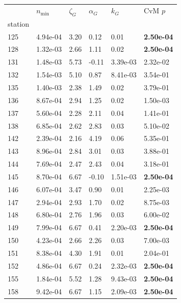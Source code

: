 \begin{figure}[htbp!]
{\begin{minipage}[t]{0.48\linewidth}
        \centering
        \begin{tabular}{llllll}
        \toprule
         & $n_{\min}$ & $\zeta_G$ & $\alpha_G$ & $k_G$ & CvM $p$ \\
        station &  &  &  &  &  \\
        \midrule
                    125 & 4.94e-04 & 3.20 & 0.12 & 0.01 & \textbf{2.50e-04}\\
                    128 & 1.32e-03 & 2.66 & 1.11 & 0.02 & \textbf{2.50e-04}\\
                    131 & 1.48e-03 & 5.73 & -0.11 & 3.39e-03 & 2.32e-02\\
                    132 & 1.54e-03 & 5.10 & 0.87 & 8.41e-03 & 3.54e-01\\
                    135 & 1.40e-03 & 2.38 & 1.49 & 0.02 & 3.79e-01\\
                    136 & 8.67e-04 & 2.94 & 1.25 & 0.02 & 1.50e-03\\
                    137 & 5.60e-04 & 2.28 & 2.11 & 0.04 & 1.41e-01\\
                    138 & 6.85e-04 & 2.62 & 2.83 & 0.03 & 5.10e-02\\
                    142 & 2.39e-04 & 2.16 & 4.19 & 0.06 & 5.35e-01\\
                    143 & 8.96e-04 & 2.84 & 3.01 & 0.03 & 3.88e-01\\
                    144 & 7.69e-04 & 2.47 & 2.43 & 0.04 & 3.18e-01\\
                    145 & 8.70e-04 & 6.67 & -0.10 & 1.51e-03 & \textbf{2.50e-04}\\
                    146 & 6.07e-04 & 3.47 & 0.90 & 0.01 & 2.25e-03\\
                    147 & 2.94e-04 & 2.93 & 1.70 & 0.02 & 8.75e-03\\
                    148 & 6.80e-04 & 2.76 & 1.96 & 0.03 & 6.00e-02\\
                    149 & 7.99e-04 & 6.67 & 0.41 & 2.20e-03 & \textbf{2.50e-04}\\
                    150 & 4.23e-04 & 2.66 & 2.26 & 0.03 & 7.00e-03\\
                    151 & 8.38e-04 & 4.30 & 1.91 & 0.01 & 2.04e-01\\
                    152 & 4.86e-04 & 6.67 & 0.24 & 2.32e-03 & \textbf{2.50e-04}\\
                    155 & 1.84e-04 & 5.52 & 1.28 & 9.43e-03 & \textbf{2.50e-04}\\
                    158 & 9.42e-04 & 6.67 & 1.15 & 2.09e-03 & \textbf{2.50e-04}\\

\end{tabular}
\end{minipage}}
\end{figure}
